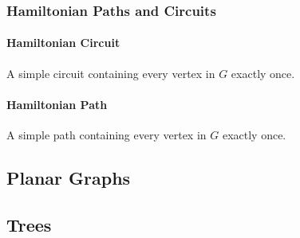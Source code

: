 \documentclass[a4paper, 10pt]{article}
\begin{document}
\subsubsection{Hamiltonian Paths and Circuits}
\paragraph{Hamiltonian Circuit}
A simple circuit containing every vertex in \(G\) exactly once.
\paragraph{Hamiltonian Path}
A simple path containing every vertex in \(G\) exactly once.

\subsection{Planar Graphs}

\subsection{Trees}
\end{document}
